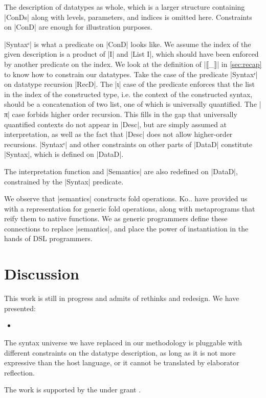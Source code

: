 \documentclass[sigplan,review,fleqn]{acmart}
\renewcommand{\verb}{\collectverb{\color{AgdaFunction}}}
\newcommand{\con}{\collectverb{\color{AgdaInductiveConstructor}}}
\begin{document}
The description of datatypes as whole, which is a larger structure containing \verb|ConDs| along with levels, parameters, and indices is omitted here.
Constraints on \verb|ConD| are enough for illustration purposes.

\verb|Syntaxᶜ| is what a predicate on \verb|ConD| looks like.
We assume the index of the given description is a product of \verb|I| and \verb|List I|, which should have been enforced by another predicate on the index.
We look at the definition of \verb|⟦_⟧| in \cref{sec:recap} to know how to constrain our datatypes.
Take the case of the predicate \verb|Syntaxʳ| on datatype recursion \verb|RecD|.
The \con|ι| case of the predicate enforces that the list in the index of the constructed type, i.e. the context of the constructed syntax, should be a concatenation of two list, one of which is universally quantified.
The \con|π| case forbids higher order recursion.
This fills in the gap that universally quantified contexts do not appear in \verb|Desc|, but are simply assumed at interpretation, as well as the fact that \verb|Desc| does not allow higher-order recursions.
\verb|Syntaxᶜ| and other constraints on other parts of \verb|DataD| constitute \verb|Syntax|, which is defined on \verb|DataD|.

The interpretation function and \verb|Semantics| are also redefined on \verb|DataD|, constrained by the \verb|Syntax| predicate.

We observe that \verb|semantics| constructs fold operations.
Ko.. have provided us with a representation for generic fold operations, along with metaprograms that reify them to native functions.
We as generic programmers define these connections to replace \verb|semantics|, and place the power of instantiation in the hands of DSL programmers.


\section{Discussion}
This work is still in progress and admits of rethinks and redesign.
We have presented:
\begin{itemize}
	\item
\end{itemize}
The syntax universe we have replaced in our methodology is pluggable with different constraints on the datatype description, as long as it is not more expressive than the host language, or it cannot be translated by elaborator reflection.

\begin{acks}
The work is supported by the  under grant .
\end{acks}
\end{document}
